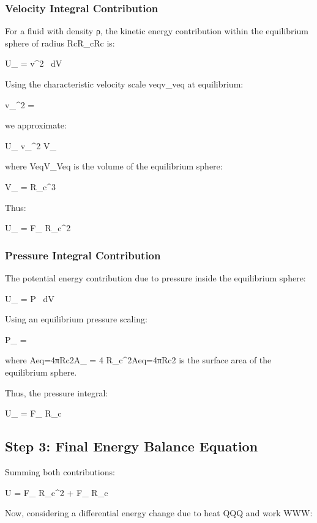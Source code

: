 \subsubsection*{Velocity Integral Contribution}
For a fluid with density ρ, the kinetic energy contribution within the equilibrium sphere of radius RcR_cRc​ is:

U_{} =  \rho \int v^2 \, dV

Using the characteristic velocity scale veqv_{}veq​ at equilibrium:

v_{}^2 = 

we approximate:

U_{} \approx {} \rho v_{}^2 \cdot V_{}

where VeqV_{}Veq​ is the volume of the equilibrium sphere:

V_{} =  \pi R_c^3

Thus:

U_{} =  \pi F_{\max} R_c^2



\subsubsection*{Pressure Integral Contribution}
The potential energy contribution due to pressure inside the equilibrium sphere:

U_{} = \int P \, dV

Using an equilibrium pressure scaling:

P_{} = 

where Aeq=4πRc2A_{} = 4 \pi R_c^2Aeq​=4πRc2​ is the surface area of the equilibrium sphere.

Thus, the pressure integral:

U_{} =  F_{\max} R_c



\subsection*{Step 3: Final Energy Balance Equation}
Summing both contributions:

U =  \pi F_{\max} R_c^2 +  F_{\max} R_c

Now, considering a differential energy change due to heat QQQ and work WWW:

